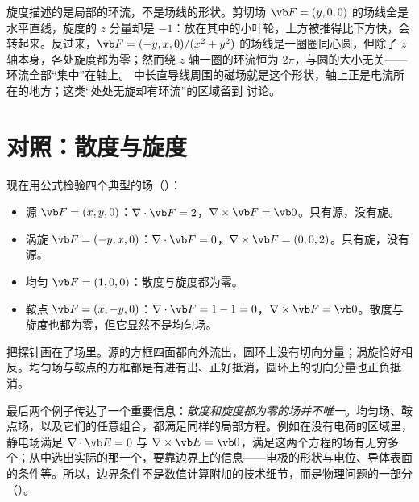 \begin{pitfall}
旋度描述的是局部的环流，不是场线的形状。剪切场 $\vb F=(y,0,0)$ 的场线全是水平直线，旋度的 $z$ 分量却是 $-1$：放在其中的小叶轮，上方被推得比下方快，会转起来。反过来，$\vb F=(-y,x,0)/(x^2+y^2)$ 的场线是一圈圈同心圆，但除了 $z$ 轴本身，各处旋度都为零；然而绕 $z$ 轴一圈的环流恒为 $2\pi$，与圆的大小无关——环流全部“集中”在轴上。 中长直导线周围的磁场就是这个形状，轴上正是电流所在的地方；这类“处处无旋却有环流”的区域留到 讨论。
\end{pitfall}

\section{对照：散度与旋度}\label{sec:calc-compare}

现在用公式检验四个典型的场（）：
\begin{itemize}
\item 源 $\vb F=(x,y,0)$：$\nabla\cdot\vb F=2$，$\nabla\times\vb F=\vb 0$。只有源，没有旋。
\item 涡旋 $\vb F=(-y,x,0)$：$\nabla\cdot\vb F=0$，$\nabla\times\vb F=(0,0,2)$。只有旋，没有源。
\item 均匀 $\vb F=(1,0,0)$：散度与旋度都为零。
\item 鞍点 $\vb F=(x,-y,0)$：$\nabla\cdot\vb F=1-1=0$，$\nabla\times\vb F=\vb 0$。散度与旋度也都为零，但它显然不是均匀场。
\end{itemize}


 把探针画在了场里。源的方框四面都向外流出，圆环上没有切向分量；涡旋恰好相反。均匀场与鞍点的方框都是有进有出、正好抵消，圆环上的切向分量也正负抵消。

最后两个例子传达了一个重要信息：\emph{散度和旋度都为零的场并不唯一}。均匀场、鞍点场，以及它们的任意组合，都满足同样的局部方程。例如在没有电荷的区域里，静电场满足 $\nabla\cdot\vb E=0$ 与 $\nabla\times\vb E=\vb 0$，满足这两个方程的场有无穷多个；从中选出实际的那一个，要靠边界上的信息——电极的形状与电位、导体表面的条件等。所以，边界条件不是数值计算附加的技术细节，而是物理问题的一部分（）。

